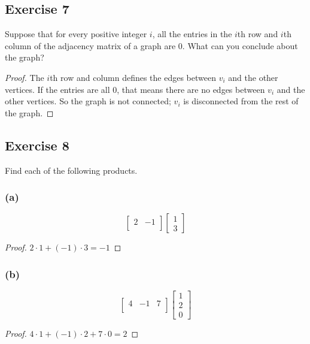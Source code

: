 \documentclass[14pt]{extarticle}
\begin{document}
\subsection{Exercise 7}
Suppose that for every positive integer \(i\), all the entries in the \(i\)th row and \(i\)th column of the adjacency matrix
of a graph are 0. What can you conclude about the graph?

\begin{proof}
    The \(i\)th row and column defines the edges between \(v_i\) and the other vertices. If the entries are all 0, that means
    there are no edges between \(v_i\) and the other vertices. So the graph is not connected; \(v_i\) is disconnected from the
    rest of the graph.
\end{proof}

\subsection{Exercise 8}
Find each of the following products.

\subsubsection{(a)}
\[
    \left[
        \begin{array}{rr}
            2 & -1 \\
        \end{array}
        \right]
    \left[
        \begin{array}{c}
            1 \\
            3
        \end{array}
        \right]
\]
\begin{proof}
    \(2 \cdot 1 + (-1) \cdot 3 = -1\)
\end{proof}

\subsubsection{(b)}
\[
    \left[
        \begin{array}{rrr}
            4 & -1 & 7 \\
        \end{array}
        \right]
    \left[
        \begin{array}{c}
            1 \\
            2 \\
            0
        \end{array}
        \right]
\]
\begin{proof}
    \(4 \cdot 1 + (-1) \cdot 2 + 7 \cdot 0 = 2\)
\end{proof}
\end{document}
